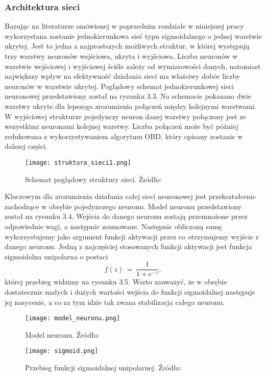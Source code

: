 \subsubsection{Architektura sieci}
Bazując na literaturze omówionej w poprzednim rozdziale w niniejszej pracy wykorzystana zostanie jednokierunkowa sieć typu sigmoidalnego o jednej warstwie ukrytej. Jest to jedna z najprostszych możliwych struktur, w której występują trzy warstwy neuronów wejściowa, ukryta i wyjściowa. Liczba neuronów w warstwie wejściowej i wyjściowej ściśle zależy od wymiarowości danych, natomiast największy wpływ na efektywność działania sieci ma właściwy dobór liczby neuronów w warstwie ukrytej. Poglądowy schemat jednokierunkowej sieci neuronowej przedstawiony został na rysunku 3.3. Na schemacie pokazano dwie warstwy ukryte dla lepszego zrozumienia połączeń między kolejnymi warstwami. W wyjściowej strukturze pojedynczy neuron danej warstwy połączony jest ze wszystkimi neuronami kolejnej warstwy. Liczba połączeń może być później redukowana z wykorzystywaniem algorytmu OBD, który opisany zostanie w dalszej części. 
\begin{figure}[!h]
    \label{fig:struktura-sieci}
    \centering \texttt{[image: struktura\_sieci1.png]}
    \caption{Schemat poglądowy struktury sieci. Źródło: \cite{nielsen2015} }
\end{figure}

\par Kluczowym dla zrozumienia działania całej sieci neuronowej jest przekształcenie zachodzące w obrębie pojedynczego neuronu. Model neuronu przedstawiony został na rysunku 3.4. Wejścia do danego neuronu zostają przemnożone przez odpowiednie wagi, a następnie zsumowane. Następnie obliczoną sumę wykorzystujemy jako argument funkcji aktywacji przez co otrzymujemy wyjście z danego neuronu. Jedną z najczęściej stosowanych funkcji aktywacji jest funkcja sigmoidalna unipolarna o postaci 
\begin{equation}
f(z) \, = \, \frac{1}{1+e^{-z}}, 
\end{equation}
której przebieg widzimy na rysunku 3.5. Warto zauważyć, że w obrębie dostatecznie małych i dużych wartości wejścia do funkcji sigmoidalnej następuje jej nasycenie, a co za tym idzie tak zwana stabilizacja całego neuronu.
\begin{figure}[!h]
    \label{fig:struktura-sieci}
    \centering \texttt{[image: model\_neuronu.png]}
    \caption{Model neuronu. Źródło: \cite{wawrzynski2019} }
\end{figure}
\begin{figure}[!h]
    \label{fig:sigmoid}
    \centering \texttt{[image: sigmoid.png]}
    \caption{Przebieg funkcji sigmoidalnej unipolarnej. Źródło: \cite{nielsen2015}}
\end{figure}

